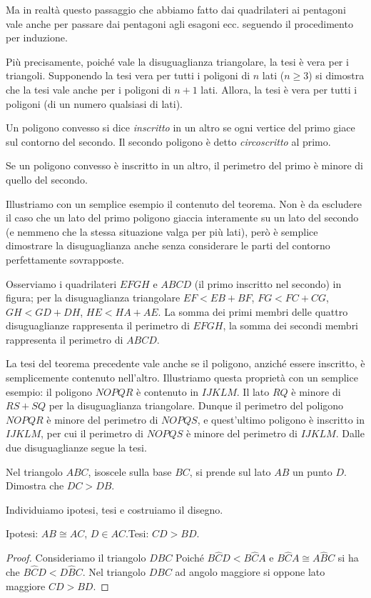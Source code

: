 Ma in realtà questo passaggio che abbiamo fatto dai quadrilateri ai pentagoni vale anche per passare dai pentagoni agli esagoni ecc. seguendo il procedimento per induzione.

Più precisamente, poiché vale la disuguaglianza triangolare, la tesi è vera per i triangoli. Supponendo la tesi vera per tutti i poligoni di $n$ lati ($n\geq 3$) si dimostra che la tesi vale anche per i poligoni di $n+1$ lati. Allora, la tesi è vera per tutti i poligoni (di un numero qualsiasi di lati).

\begin{definizione}
Un poligono convesso si dice \emph{inscritto} in un altro se ogni vertice del primo giace sul contorno del secondo. Il secondo poligono è detto \emph{circoscritto} al primo.
\end{definizione}

\begin{teorema}
Se un poligono convesso è inscritto in un altro, il perimetro del primo è minore di quello del secondo.
\end{teorema}

Illustriamo con un semplice esempio il contenuto del teorema. Non è da escludere il caso che un lato del primo poligono giaccia interamente su un lato del secondo (e nemmeno che la stessa situazione valga per più lati), però è semplice dimostrare la disuguaglianza anche senza considerare le parti del contorno perfettamente sovrapposte.

Osserviamo i quadrilateri $EFGH$ e $ABCD$ (il primo inscritto nel secondo) in figura; per la disuguaglianza triangolare $EF<EB+BF$, $FG<FC+CG$, $GH<GD+DH$, $HE<HA+AE$. La somma dei primi membri delle quattro disuguaglianze rappresenta il perimetro di $EFGH$, la somma dei secondi membri rappresenta il perimetro di $ABCD$.

La tesi del teorema precedente vale anche se il poligono, anziché essere inscritto, è semplicemente contenuto nell'altro. 
Illustriamo questa proprietà con un semplice esempio: il poligono $NOPQR$ è contenuto in $IJKLM$. Il lato $RQ$ è minore di $RS+SQ$ per la disuguaglianza triangolare. Dunque il perimetro del poligono $NOPQR$ è minore del perimetro di $NOPQS$, e quest'ultimo poligono è inscritto in $IJKLM$, per cui il perimetro di $NOPQS$ è minore del perimetro di $IJKLM$. Dalle due disuguaglianze segue la tesi.

\begin{exrig}
\begin{esempio}
Nel triangolo $ABC$, isoscele sulla base $BC$, si prende sul lato $AB$ un punto $D$. Dimostra che $DC>DB$.

Individuiamo ipotesi, tesi e costruiamo il disegno.

\noindent Ipotesi: $AB\cong AC$, $D\in AC$.\tab Tesi: $CD>BD$.

\begin{proof}
Consideriamo il triangolo $DBC$
Poiché $B\widehat{C}D<B\widehat{C}A$ e $B\widehat{C}A\cong A\widehat{B}C$ si ha che $B\widehat{C}D<D\widehat{B}C$.
Nel triangolo $DBC$ ad angolo maggiore si oppone lato maggiore $CD>BD$.
\end{proof}
\end{esempio}
\end{exrig}

\newpage



\cleardoublepage